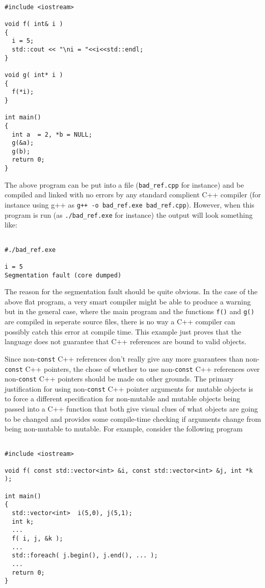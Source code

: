 {\scriptsize\begin{verbatim}

#include <iostream>

void f( int& i )
{
  i = 5;
  std::cout << "\ni = "<<i<<std::endl;
}

void g( int* i )
{
  f(*i);
}

int main()
{
  int a  = 2, *b = NULL;
  g(&a);
  g(b);
  return 0;
}

\end{verbatim}}

The above program can be put into a file ({}\texttt{bad\_ref.cpp} for
instance) and be compiled and linked with no errors by any standard
complient C++ compiler (for instance using g++ as {}\texttt{g++ -o
bad\_ref.exe bad\_ref.cpp}).  However, when this program is run (as
{}\texttt{./bad\_ref.exe} for instance) the output will look something
like:

{\scriptsize\begin{verbatim}

#./bad_ref.exe

i = 5
Segmentation fault (core dumped)

\end{verbatim}}

The reason for the segmentation fault should be quite obvious.  In the
case of the above flat program, a very smart compiler might be able to
produce a warning but in the general case, where the main program and
the functions {}\texttt{f()} and {}\texttt{g()} are compiled in
seperate source files, there is no way a C++ compiler can possibly
catch this error at compile time.  This example just proves that the
language does not guarantee that C++ references are bound to valid
objects.

Since non-{}\texttt{const} C++ references don't really give any more
guarantees than non-{}\texttt{const} C++ pointers, the chose of
whether to use non-{}\texttt{const} C++ references over
non-{}\texttt{const} C++ pointers should be made on other grounds.
The primary justification for using non-{}\texttt{const} C++ pointer
arguments for mutable objects is to force a different specification
for non-mutable and mutable objects being passed into a C++ function
that both give visual clues of what objects are going to be changed
and provides some compile-time checking if arguments change from being
non-mutable to mutable.  For example, consider the following program

{\scriptsize\begin{verbatim}

#include <iostream>

void f( const std::vector<int> &i, const std::vector<int> &j, int *k );

int main()
{
  std::vector<int>  i(5,0), j(5,1);
  int k;
  ...
  f( i, j, &k );
  ...
  std::foreach( j.begin(), j.end(), ... );
  ...
  return 0;
}

\end{verbatim}}


